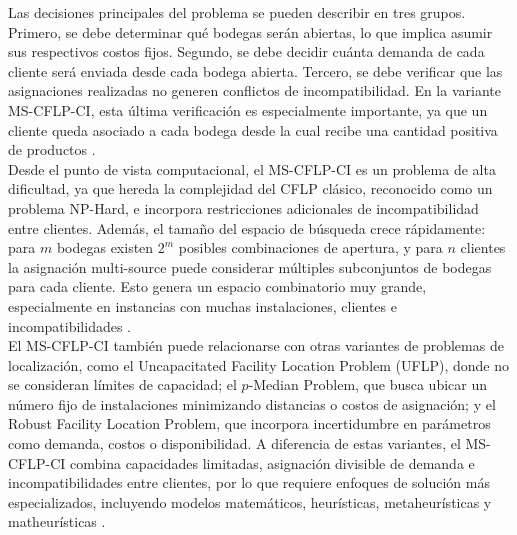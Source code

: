 \noindent Las decisiones principales del problema se pueden describir en tres grupos. Primero, se debe determinar qué bodegas serán abiertas, lo que implica asumir sus respectivos costos fijos. Segundo, se debe decidir cuánta demanda de cada cliente será enviada desde cada bodega abierta. Tercero, se debe verificar que las asignaciones realizadas no generen conflictos de incompatibilidad. En la variante MS-CFLP-CI, esta última verificación es especialmente importante, ya que un cliente queda asociado a cada bodega desde la cual recibe una cantidad positiva de productos \cite{mansini2022kernel,ceschia2024multineighborhood}.\\

\noindent Desde el punto de vista computacional, el MS-CFLP-CI es un problema de alta dificultad, ya que hereda la complejidad del CFLP clásico, reconocido como un problema NP-Hard, e incorpora restricciones adicionales de incompatibilidad entre clientes. Además, el tamaño del espacio de búsqueda crece rápidamente: para $m$ bodegas existen $2^m$ posibles combinaciones de apertura, y para $n$ clientes la asignación multi-source puede considerar múltiples subconjuntos de bodegas para cada cliente. Esto genera un espacio combinatorio muy grande, especialmente en instancias con muchas instalaciones, clientes e incompatibilidades \cite{klose2005facility,maia2023metaheuristic,ceschia2024multineighborhood}.\\

\noindent El MS-CFLP-CI también puede relacionarse con otras variantes de problemas de localización, como el Uncapacitated Facility Location Problem (UFLP), donde no se consideran límites de capacidad; el $p$-Median Problem, que busca ubicar un número fijo de instalaciones minimizando distancias o costos de asignación; y el Robust Facility Location Problem, que incorpora incertidumbre en parámetros como demanda, costos o disponibilidad. A diferencia de estas variantes, el MS-CFLP-CI combina capacidades limitadas, asignación divisible de demanda e incompatibilidades entre clientes, por lo que requiere enfoques de solución más especializados, incluyendo modelos matemáticos, heurísticas, metaheurísticas y matheurísticas \cite{fischetti2016benders,maia2023metaheuristic,mansini2022kernel,ceschia2024multineighborhood}.
